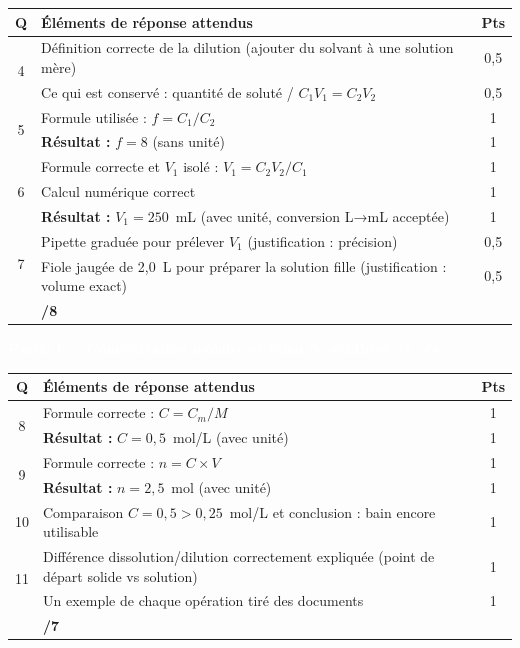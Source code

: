 \documentclass[10pt,a4paper]{article}
\newcommand{\exotitle}[2]{%
  \noindent\colorbox{exoheader}{%
    \parbox{\dimexpr\linewidth-2\fboxsep\relax}{%
      \textcolor{white}{\textbf{\large #1 \hfill #2}}%
    }%
  }%
}
\begin{document}
\begin{tabularx}{\linewidth}{|c|X|c|}
  \hline
  \rowcolor{exolight}
  \textbf{Q} & \textbf{Éléments de réponse attendus} & \textbf{Pts} \\
  \hline
  \multirow{2}{*}{4}
  & Définition correcte de la dilution (ajouter du solvant à une solution mère)
  & 0{,}5 \\
  \cline{2-3}
  & Ce qui est conservé : quantité de soluté / $C_1 V_1 = C_2 V_2$
  & 0{,}5 \\
  \hline
  \multirow{2}{*}{5}
  & Formule utilisée : $f = C_1 / C_2$
  & 1 \\
  \cline{2-3}
  & \textbf{Résultat :} $f = 8$ (sans unité)
  & 1 \\
  \hline
  \multirow{3}{*}{6}
  & Formule correcte et $V_1$ isolé : $V_1 = C_2 V_2 / C_1$
  & 1 \\
  \cline{2-3}
  & Calcul numérique correct
  & 1 \\
  \cline{2-3}
  & \textbf{Résultat :} $V_1 = 250$~mL (avec unité, conversion L→mL acceptée)
  & 1 \\
  \hline
  \multirow{2}{*}{7}
  & Pipette graduée pour prélever $V_1$ (justification : précision)
  & 0{,}5 \\
  \cline{2-3}
  & Fiole jaugée de 2,0~L pour préparer la solution fille (justification : volume exact)
  & 0{,}5 \\
  \hline
  \rowcolor{totalrow}
  \multicolumn{2}{|r|}{\textbf{Sous-total Partie B}} & \textbf{/8} \\
  \hline
\end{tabularx}

\vspace{4mm}

\exotitle{Partie C -- Concentration molaire et bilan de synthèse}{/7 pts}

\vspace{1mm}

\begin{tabularx}{\linewidth}{|c|X|c|}
  \hline
  \rowcolor{exolight}
  \textbf{Q} & \textbf{Éléments de réponse attendus} & \textbf{Pts} \\
  \hline
  \multirow{2}{*}{8}
  & Formule correcte : $C = C_m / M$
  & 1 \\
  \cline{2-3}
  & \textbf{Résultat :} $C = 0{,}5$~mol/L (avec unité)
  & 1 \\
  \hline
  \multirow{2}{*}{9}
  & Formule correcte : $n = C \times V$
  & 1 \\
  \cline{2-3}
  & \textbf{Résultat :} $n = 2{,}5$~mol (avec unité)
  & 1 \\
  \hline
  10
  & Comparaison $C = 0{,}5 > 0{,}25$~mol/L et conclusion : bain encore utilisable
  & 1 \\
  \hline
  \multirow{2}{*}{11}
  & Différence dissolution/dilution correctement expliquée (point de départ solide vs solution)
  & 1 \\
  \cline{2-3}
  & Un exemple de chaque opération tiré des documents
  & 1 \\
  \hline
  \rowcolor{totalrow}
  \multicolumn{2}{|r|}{\textbf{Sous-total Partie C}} & \textbf{/7} \\
  \hline
\end{tabularx}
\end{document}
